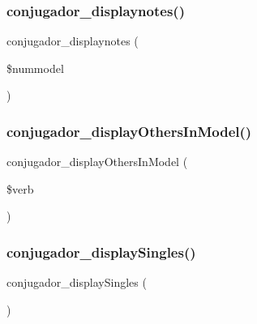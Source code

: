 \subsubsection{\texorpdfstring{conjugador\+\_\+displaynotes()}{conjugador\_displaynotes()}}
{\footnotesize\ttfamily conjugador\+\_\+displaynotes (\begin{DoxyParamCaption}\item[{}]{\$nummodel }\end{DoxyParamCaption})}

\hypertarget{conjoc__web_form_8inc_a64885b968e081840d6a10adc2a38db9e}{}\label{conjoc__web_form_8inc_a64885b968e081840d6a10adc2a38db9e} 
\subsubsection{\texorpdfstring{conjugador\+\_\+display\+Others\+In\+Model()}{conjugador\_displayOthersInModel()}}
{\footnotesize\ttfamily conjugador\+\_\+display\+Others\+In\+Model (\begin{DoxyParamCaption}\item[{}]{\$verb }\end{DoxyParamCaption})}

\hypertarget{conjoc__web_form_8inc_ac41ee7cf6ccd6dd46de8112c7c315cfe}{}\label{conjoc__web_form_8inc_ac41ee7cf6ccd6dd46de8112c7c315cfe} 
\subsubsection{\texorpdfstring{conjugador\+\_\+display\+Singles()}{conjugador\_displaySingles()}}
{\footnotesize\ttfamily conjugador\+\_\+display\+Singles (\begin{DoxyParamCaption}{ }\end{DoxyParamCaption})}

\hypertarget{conjoc__web_form_8inc_adfb69460570fdffecec436447f5ed729}{}\label{conjoc__web_form_8inc_adfb69460570fdffecec436447f5ed729} 

